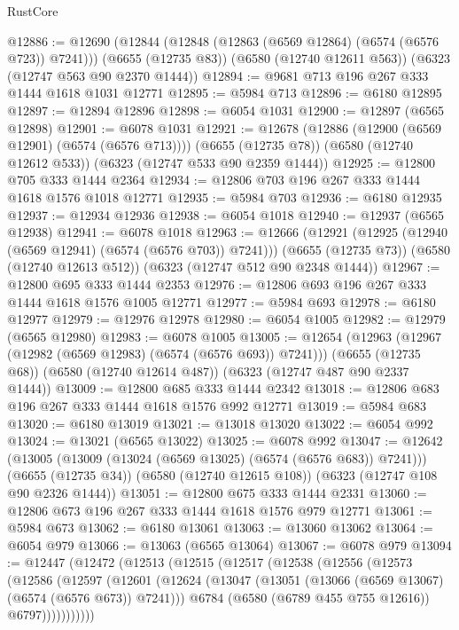 \begin{lexlean}{RustCore}
\begin{coremodule}
@12886 := @12690
    (@12844 (@12848 (@12863 (@6569 @12864) (@6574 (@6576 @723)) @7241)))
    (@6655 (@12735 @83))
    (@6580 (@12740 @12611 @563))
    (@6323 (@12747 @563 @90 @2370 @1444))
@12894 := @9681 @713 @196 @267 @333 @1444 @1618 @1031 @12771
@12895 := @5984 @713
@12896 := @6180 @12895
@12897 := @12894 @12896
@12898 := @6054 @1031
@12900 := @12897 (@6565 @12898)
@12901 := @6078 @1031
@12921 := @12678
    (@12886 (@12900 (@6569 @12901) (@6574 (@6576 @713))))
    (@6655 (@12735 @78))
    (@6580 (@12740 @12612 @533))
    (@6323 (@12747 @533 @90 @2359 @1444))
@12925 := @12800 @705 @333 @1444 @2364
@12934 := @12806 @703 @196 @267 @333 @1444 @1618 @1576 @1018 @12771
@12935 := @5984 @703
@12936 := @6180 @12935
@12937 := @12934 @12936
@12938 := @6054 @1018
@12940 := @12937 (@6565 @12938)
@12941 := @6078 @1018
@12963 := @12666
    (@12921 (@12925 (@12940 (@6569 @12941) (@6574 (@6576 @703)) @7241)))
    (@6655 (@12735 @73))
    (@6580 (@12740 @12613 @512))
    (@6323 (@12747 @512 @90 @2348 @1444))
@12967 := @12800 @695 @333 @1444 @2353
@12976 := @12806 @693 @196 @267 @333 @1444 @1618 @1576 @1005 @12771
@12977 := @5984 @693
@12978 := @6180 @12977
@12979 := @12976 @12978
@12980 := @6054 @1005
@12982 := @12979 (@6565 @12980)
@12983 := @6078 @1005
@13005 := @12654
    (@12963 (@12967 (@12982 (@6569 @12983) (@6574 (@6576 @693)) @7241)))
    (@6655 (@12735 @68))
    (@6580 (@12740 @12614 @487))
    (@6323 (@12747 @487 @90 @2337 @1444))
@13009 := @12800 @685 @333 @1444 @2342
@13018 := @12806 @683 @196 @267 @333 @1444 @1618 @1576 @992 @12771
@13019 := @5984 @683
@13020 := @6180 @13019
@13021 := @13018 @13020
@13022 := @6054 @992
@13024 := @13021 (@6565 @13022)
@13025 := @6078 @992
@13047 := @12642
    (@13005 (@13009 (@13024 (@6569 @13025) (@6574 (@6576 @683)) @7241)))
    (@6655 (@12735 @34))
    (@6580 (@12740 @12615 @108))
    (@6323 (@12747 @108 @90 @2326 @1444))
@13051 := @12800 @675 @333 @1444 @2331
@13060 := @12806 @673 @196 @267 @333 @1444 @1618 @1576 @979 @12771
@13061 := @5984 @673
@13062 := @6180 @13061
@13063 := @13060 @13062
@13064 := @6054 @979
@13066 := @13063 (@6565 @13064)
@13067 := @6078 @979
@13094 := @12447
    (@12472
      (@12513
        (@12515
          (@12517
            (@12538
              (@12556
                (@12573
                  (@12586
                    (@12597
                      (@12601
                        (@12624
                          (@13047 (@13051 (@13066 (@6569 @13067) (@6574 (@6576 @673)) @7241)))
                          @6784
                          (@6580 (@6789 @455 @755 @12616))
                          @6797)))))))))))

\end{coremodule}
\end{lexlean}
